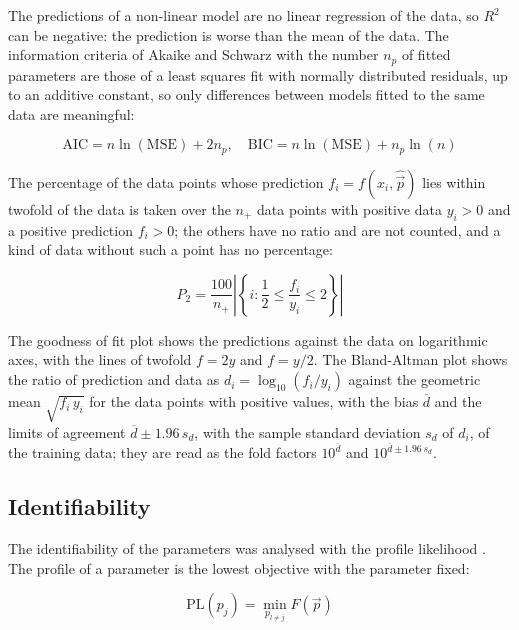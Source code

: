 The predictions of a non-linear model are no linear regression of the data, so $R^2$ can be negative: the prediction is worse than the mean of the data. The information criteria of Akaike \cite{Akaike1974} and Schwarz \cite{Schwarz1978} with the number $n_p$ of fitted parameters are those of a least squares fit with normally distributed residuals, up to an additive constant, so only differences between models fitted to the same data are meaningful:

\begin{equation}
\mathrm{AIC} = n \ln(\mathrm{MSE}) + 2 n_p, \quad \mathrm{BIC} = n \ln(\mathrm{MSE}) + n_p \ln(n)
\end{equation}

The percentage of the data points whose prediction $f_i = f(x_i, \hat{\vec{p}})$ lies within twofold of the data is taken over the $n_+$ data points with positive data $y_i > 0$ and a positive prediction $f_i > 0$; the others have no ratio and are not counted, and a kind of data without such a point has no percentage:

\begin{equation}
P_2 = \frac{100}{n_+} \left|\left\{ i : \frac{1}{2} \le \frac{f_i}{y_i} \le 2 \right\}\right|
\end{equation}

The goodness of fit plot shows the predictions against the data on logarithmic axes, with the lines of twofold $f = 2y$ and $f = y/2$. The Bland-Altman plot \cite{Bland1986} shows the ratio of prediction and data as $d_i = \log_{10}(f_i / y_i)$ against the geometric mean $\sqrt{f_i\, y_i}$ for the data points with positive values, with the bias $\overline{d}$ and the limits of agreement $\overline{d} \pm 1.96\, s_d$, with the sample standard deviation $s_d$ of $d_i$, of the training data; they are read as the fold factors $10^{\overline{d}}$ and $10^{\overline{d} \pm 1.96\, s_d}$.

\subsection{Identifiability}

The identifiability of the parameters was analysed with the profile likelihood \cite{Raue2009,Kreutz2013}. The profile of a parameter is the lowest objective with the parameter fixed:

\begin{equation}
\mathrm{PL}(p_j) = \min_{p_{l \neq j}} F(\vec{p})
\end{equation}

